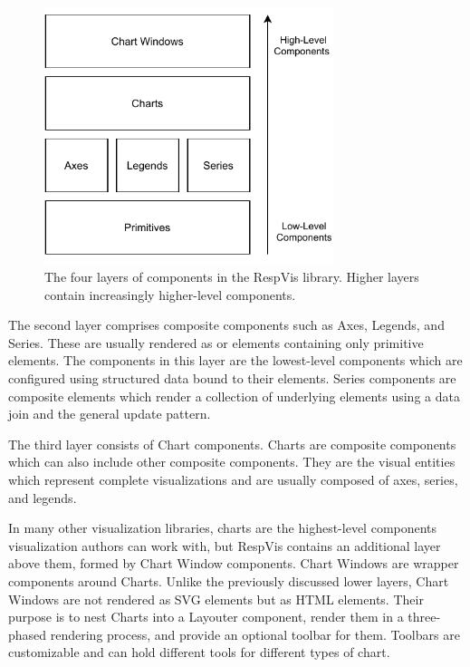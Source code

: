 \begin{figure}[tp]
\centering
\includegraphics[keepaspectratio,width=\linewidth,height=7.5cm]
{diagrams/respvis-layers.pdf}
\caption[Component Layers of RespVis]{
The four layers of components in the RespVis library. Higher layers
contain increasingly higher-level components.
}
\label{fig:Layers}
\end{figure}


The second layer comprises composite components such as Axes, Legends,
and Series. These are usually rendered as  or 
elements containing only primitive elements. The components in this
layer are the lowest-level components which are configured using
structured data bound to their elements. Series components are
composite elements which render a collection of underlying elements
using a data join and the general update pattern.

The third layer consists of Chart components. Charts are composite
components which can also include other composite components. They are
the visual entities which represent complete visualizations and are
usually composed of axes, series, and legends.

In many other visualization libraries, charts are the highest-level
components visualization authors can work with, but RespVis contains
an additional layer above them, formed by Chart Window components.
Chart Windows are wrapper components around Charts. Unlike the
previously discussed lower layers, Chart Windows are not rendered as
SVG elements but as HTML  elements. Their purpose is to
nest Charts into a Layouter component, render them in a three-phased
rendering process, and provide an optional toolbar for them. Toolbars
are customizable and can hold different tools for different types of
chart.








